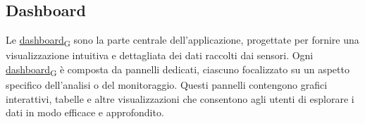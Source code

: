 \newpage
\subsection{Dashboard}
Le \href{https://7last.github.io/docs/pb/documentazione-interna/glossario\#dashboard}{dashboard\textsubscript{G}} sono la parte centrale dell'applicazione, progettate per fornire una visualizzazione intuitiva e dettagliata dei dati raccolti dai sensori. Ogni \href{https://7last.github.io/docs/pb/documentazione-interna/glossario\#dashboard}{dashboard\textsubscript{G}} è composta da pannelli dedicati, ciascuno focalizzato su un aspetto specifico dell'analisi o del monitoraggio. Questi pannelli contengono grafici interattivi, tabelle e altre visualizzazioni che consentono agli utenti di esplorare i dati in modo efficace e approfondito.

